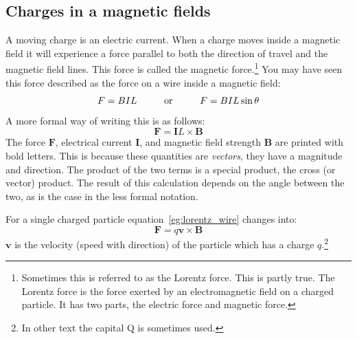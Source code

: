 \documentclass[12pt,a4paper]{article}
\numberwithin{equation}{section}
\numberwithin{figure}{section}
\numberwithin{table}{section}
\begin{document}
\subsection{Charges in a magnetic fields}
A moving charge is an electric current. When a charge moves inside a magnetic field it will experience a force parallel to both the direction of travel and the magnetic field lines. This force is called the magnetic force.\footnote{Sometimes this is referred to as the Lorentz force. This is partly true. The Lorentz force is the force exerted by an electromagnetic field on a charged particle. It has two parts, the electric force and magnetic force.} You may have seen this force described as the force on a wire inside a magnetic field:
\begin{equation*}
F=BIL \hspace{10 mm} \mbox{or} \hspace{10 mm} F=BIL \sin \theta
\end{equation*}
A more formal way of writing this is as follows:
\begin{equation}
\mathbf{F}=\mathbf{I}L \times \mathbf{B} \label{eg:lorentz_wire}
\end{equation}
The force $\mathbf{F}$, electrical current $\mathbf{I}$, and magnetic field strength $\mathbf{B}$ are printed with bold letters. This is because these quantities are \textit{vectors}, they have a magnitude and direction. The product of the two terms is a special product, the cross (or vector) product. The result of this calculation depends on the angle between the two, as is the case in the less formal notation. 

For a single charged particle equation~\ref{eg:lorentz_wire} changes into:
\begin{equation}
\mathbf{F}=q\mathbf{v \times B} \label{eq:lorentz}
\end{equation}
$\mathbf{v}$ is the velocity (speed with direction) of the particle which has a charge $q$.\footnote{In other text the capital Q is sometimes used.}
\end{document}
